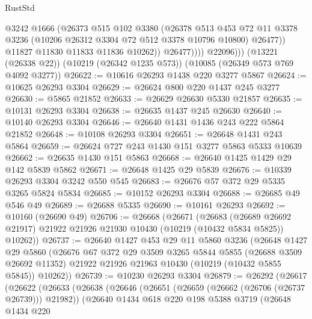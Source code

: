 \begin{lexlean}{RustStd}
\begin{coremodule}
                      @3242
                      @1666
                      (@26373
                        @515
                        @102
                        @3380
                        (@26378
                          @513
                          @453
                          @72
                          @11
                          @3378
                          @3236
                          (@10206 @26312 @3304 @72 @512 @3378 @10796 @10800)
                          @26477))
                      @11827
                      @11830
                      @11833
                      @11836
                      @10262))
                  @26477))))
          @22096)))
    (@13221 (@26338 @22))
    (@10219 (@26342 @1235 @573))
    (@10085 (@26349 @573 @769 @4092 @3277))
@26622 := @10616 @26293 @1438 @220 @3277 @5867
@26624 := @10625 @26293 @3304
@26629 := @26624 @800 @220 @1437 @245 @3277
@26630 := @5865 @21852
@26633 := @26629 @26630 @5330 @21857
@26635 := @10131 @26293 @3304
@26638 := @26635 @1437 @245 @26630
@26640 := @10140 @26293 @3304
@26646 := @26640 @1431 @1436 @243 @222 @5864 @21852
@26648 := @10108 @26293 @3304
@26651 := @26648 @1431 @243 @5864
@26659 := @26624 @727 @243 @1430 @151 @3277 @5863 @5333 @10639
@26662 := @26635 @1430 @151 @5863
@26668 := @26640 @1425 @1429 @29 @142 @5839 @5862
@26671 := @26648 @1425 @29 @5839
@26676 := @10339 @26293 @3304 @3242 @550 @545
@26683 := @26676 @57 @372 @29 @5335 @3265 @5824 @5834
@26685 := @10152 @26293 @3304
@26688 := @26685 @49 @546 @49
@26689 := @26688 @5335
@26690 := @10161 @26293
@26692 := @10160 (@26690 @49)
@26706 := @26668
    (@26671
      (@26683
        (@26689 @26692 @21917)
        @21922
        @21926
        @21930
        @10430
        (@10219 (@10432 @5834 @5825))
        @10262))
@26737 := @26640
    @1427
    @453
    @29
    @11
    @5860
    @3236
    (@26648
      @1427
      @29
      @5860
      (@26676
        @67
        @372
        @29
        @3509
        @3265
        @5844
        @5855
        (@26688 @3509 @26692 @11352)
        @21922
        @21926
        @21963
        @10430
        (@10219 (@10432 @5855 @5845))
        @10262))
@26739 := @10230 @26293 @3304
@26879 := @26292
    (@26617
      (@26622
        (@26633
          (@26638
            (@26646
              (@26651 (@26659 (@26662 (@26706 (@26737 @26739))) @21982))
              (@26640
                @1434
                @618
                @220
                @198
                @5388
                @3719
                (@26648
                  @1434
                  @220

\end{coremodule}
\end{lexlean}
